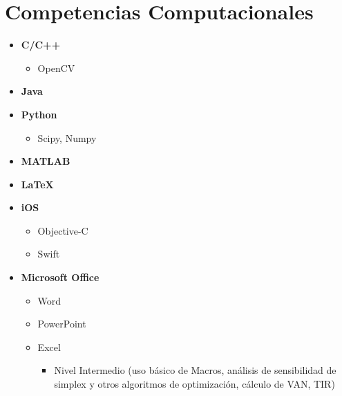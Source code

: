 \documentclass[11pt,letterpaper,sans]{moderncv}
\begin{document}
\section{Competencias Computacionales}
\label{sec:org544fd0f}
\begin{itemize}
\item \textbf{C/C++}
\begin{itemize}
\item OpenCV
\end{itemize}
\item \textbf{Java}
\item \textbf{Python}
\begin{itemize}
\item Scipy, Numpy
\end{itemize}
\item \textbf{MATLAB}
\item \textbf{\LaTeX}
\item \textbf{iOS}
\begin{itemize}
\item Objective-C
\item Swift
\end{itemize}
\item \textbf{Microsoft Office}
\begin{itemize}
\item Word
\item PowerPoint
\item Excel
\begin{itemize}
\item Nivel Intermedio (uso básico de Macros, análisis de sensibilidad de simplex y otros
algoritmos de optimización, cálculo de VAN, TIR)
\end{itemize}
\end{itemize}
\end{itemize}
\end{document}

